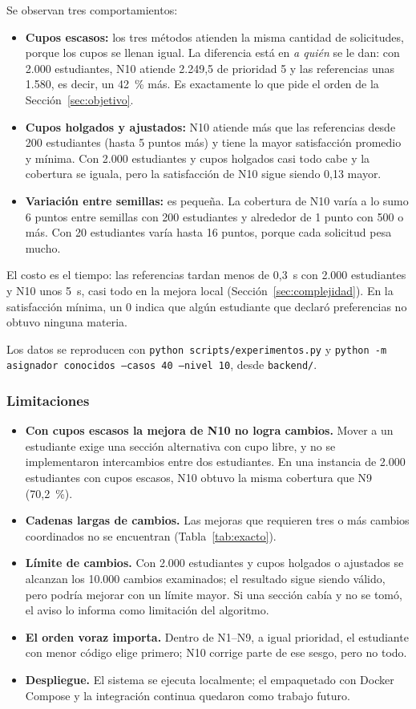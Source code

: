 Se observan tres comportamientos:
\begin{itemize}
\item \textbf{Cupos escasos:} los tres métodos atienden la misma cantidad de solicitudes, porque los cupos se llenan igual. La diferencia está en \emph{a quién} se le dan: con 2.000 estudiantes, N10 atiende 2.249,5 de prioridad 5 y las referencias unas 1.580, es decir, un 42~\% más. Es exactamente lo que pide el orden de la Sección~\ref{sec:objetivo}.
\item \textbf{Cupos holgados y ajustados:} N10 atiende más que las referencias desde 200 estudiantes (hasta 5 puntos más) y tiene la mayor satisfacción promedio y mínima. Con 2.000 estudiantes y cupos holgados casi todo cabe y la cobertura se iguala, pero la satisfacción de N10 sigue siendo 0,13 mayor.
\item \textbf{Variación entre semillas:} es pequeña. La cobertura de N10 varía a lo sumo 6 puntos entre semillas con 200 estudiantes y alrededor de 1 punto con 500 o más. Con 20 estudiantes varía hasta 16 puntos, porque cada solicitud pesa mucho.
\end{itemize}
El costo es el tiempo: las referencias tardan menos de 0,3~s con 2.000 estudiantes y N10 unos 5~s, casi todo en la mejora local (Sección~\ref{sec:complejidad}). En la satisfacción mínima, un 0 indica que algún estudiante que declaró preferencias no obtuvo ninguna materia.

Los datos se reproducen con \texttt{python scripts/experimentos.py} y \texttt{python -m asignador conocidos --casos 40 --nivel 10}, desde \texttt{backend/}.

\subsubsection{Limitaciones}\label{sec:limitaciones}

\begin{itemize}
\item \textbf{Con cupos escasos la mejora de N10 no logra cambios.} Mover a un estudiante exige una sección alternativa con cupo libre, y no se implementaron intercambios entre dos estudiantes. En una instancia de 2.000 estudiantes con cupos escasos, N10 obtuvo la misma cobertura que N9 (70,2~\%).
\item \textbf{Cadenas largas de cambios.} Las mejoras que requieren tres o más cambios coordinados no se encuentran (Tabla~\ref{tab:exacto}).
\item \textbf{Límite de cambios.} Con 2.000 estudiantes y cupos holgados o ajustados se alcanzan los 10.000 cambios examinados; el resultado sigue siendo válido, pero podría mejorar con un límite mayor. Si una sección cabía y no se tomó, el aviso lo informa como limitación del algoritmo.
\item \textbf{El orden voraz importa.} Dentro de N1--N9, a igual prioridad, el estudiante con menor código elige primero; N10 corrige parte de ese sesgo, pero no todo.
\item \textbf{Despliegue.} El sistema se ejecuta localmente; el empaquetado con Docker Compose y la integración continua quedaron como trabajo futuro.
\end{itemize}

